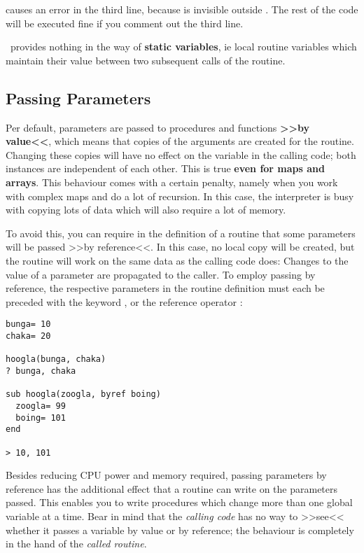 causes an error in the third line, because  is invisible
outside . The rest of the code will be executed fine if you
comment out the third line.

\SB\ provides nothing in the way of \textbf{static variables}, ie local
routine variables which maintain their value between two subsequent
calls of the routine. 

\subsection{Passing Parameters \label{passingParameters}}

Per default, parameters are passed to procedures and functions
\textbf{>>by value<<}, which means that copies of the arguments are
created for the routine.  Changing
these copies will have no effect on the variable in the calling code;
both instances are independent of each other. This is true \textbf{even
for maps and arrays}. This behaviour comes with a certain penalty,
namely when you work with complex maps and do a lot of recursion. In
this case, the interpreter is busy with copying lots of data which will
also require a lot of memory.

To avoid this, you can require in the definition of a routine that some
parameters will be passed >>by reference<<.  In this case, no local copy will be created, but
the routine will work on the same data as the calling code does: Changes
to the value of a parameter are propagated to the caller. To employ
passing by reference, the respective parameters in the routine
definition must each be preceded with the keyword , or the
reference operator \Co{\at}: 

\begin{lstlisting}
bunga= 10
chaka= 20

hoogla(bunga, chaka)
? bunga, chaka

sub hoogla(zoogla, byref boing)
  zoogla= 99
  boing= 101
end

> 10, 101
\end{lstlisting}

Besides reducing CPU power and memory required, passing parameters by
reference has the additional effect that a routine can write on the
parameters passed. This enables you to write procedures which change
more than one global variable at a time. Bear in mind that the
\emph{calling code} has no way to >>see<< whether it passes a variable
by value or by reference; the behaviour is completely in the hand of the
\emph{called routine}.

